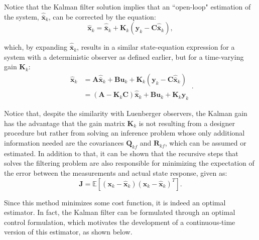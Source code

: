 \documentclass[a4paper,11pt]{book}
\numberwithin{figure}{chapter}
\numberwithin{equation}{chapter}
\numberwithin{table}{chapter}
\theoremstyle{definition}
\begin{document}
Notice that the Kalman filter solution implies that an ``open-loop" estimation of the system, $\hat{\bar{\bm{x}}}_k$, can be corrected by the equation:
\begin{equation}
    \hat{\bm{x}}_k =\hat{\bar{\bm{x}}}_k + \bm{K}_k (\bm{y}_k - \bm{C} \hat{\bar{\bm{x}}}_k)
,\end{equation}

\noindent which, by expanding $\hat{\bar{\bm{x}}}_k$, results in a similar state-equation expression for a system with a deterministic observer as defined earlier, but for a time-varying gain $\bm{K}_k$:
\begin{equation}
\begin{split}
    \hat{\bm{x}}_k &= \bm{A} \hat{\bar{\bm{x}}}_k + \bm{B} \bm{u}_k + \bm{K}_k (\bm{y}_k - \bm{C} \hat{\bar{\bm{x}}}_k) \\
    &= \left( \bm{A} - \bm{K}_k \bm{C} \right) \hat{\bar{\bm{x}}}_k + \bm{B} \bm{u}_k + \bm{K}_k \bm{y}_k
\end{split}
.\end{equation}

Notice that, despite the similarity with Luenberger observers, the Kalman gain has the advantage that the gain matrix $\bm{K}_k$ is not resulting from a designer procedure but rather from solving an inference problem whose only additional information needed are the covariances $\bm{Q}_{kf}$ and $\bm{R}_{kf}$, which can be assumed or estimated. In addition to that, it can be shown that the recursive steps that solves the filtering problem are also responsible for minimizing the expectation of the error between the measurements and actual state response, given as:
\begin{equation}
    \bm{J} = \mathbb{E}\left[ (\bm{x}_k - \hat{\bm{x}}_k)(\bm{x}_k - \hat{\bm{x}}_k)^T \right]
.\end{equation}

Since this method minimizes some cost function, it is indeed an optimal estimator. In fact, the Kalman filter can be formulated through an optimal control formulation, which motivates the development of a continuous-time version of this estimator, as shown below.
\end{document}
